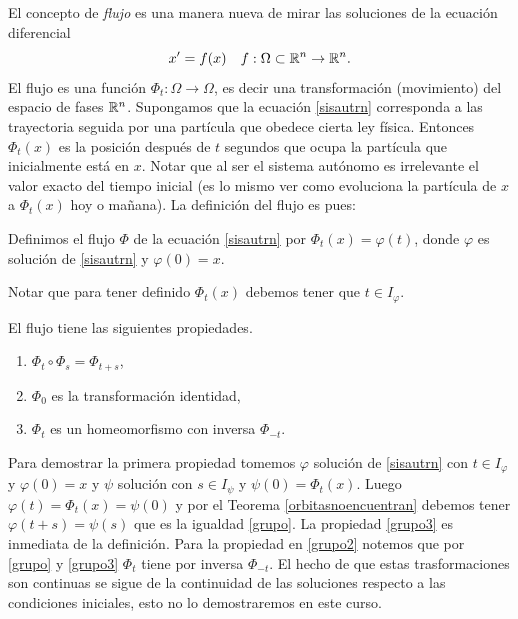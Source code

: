 El concepto de \emph{flujo} es una manera nueva de mirar las
soluciones de la ecuación diferencial
\begin{equation}\label{sisautrn}
    x'=f(x)\quad f:\Omega\subset\mathbb{R}^n\to\mathbb{R}^n.
\end{equation}
 El flujo es una función $\Phi_t:\Omega\to\Omega$, es decir una
 transformación (movimiento) del espacio de fases $\mathbb{R}^n$.
 Supongamos que la ecuación \eqref{sisautrn} corresponda a las trayectoria
 seguida por una partícula que obedece cierta ley física.
 Entonces  $\Phi_t(x)$ es la posición después de $t$ segundos que
 ocupa la partícula que inicialmente está en $x$. Notar que al ser
 el sistema autónomo es irrelevante el valor exacto del tiempo
 inicial (es lo mismo ver como evoluciona la partícula de $x$ a
 $\Phi_t(x)$ hoy o mañana). La definición del flujo es pues:
 \begin{definicion} Definimos el flujo $\Phi$ de la ecuación
 \eqref{sisautrn} por $\Phi_t(x)=\varphi(t)$, donde $\varphi$ es solución de
 \eqref{sisautrn} y $\varphi(0)=x$.
\end{definicion}
Notar que para tener definido $\Phi_t(x)$ debemos tener que $t\in
I_{\varphi}$.
\begin{teorema}{}
El flujo tiene las siguientes propiedades.
\begin{enumerate}
    \item\label{grupo} $\Phi_t\circ\Phi_s=\Phi_{t+s}$,
    \item\label{grupo3} $\Phi_0$ es la transformación identidad,
    \item\label{grupo2} $\Phi_t$ es un homeomorfismo con inversa $\Phi_{-t}$.
\end{enumerate}
\end{teorema}
\begin{demo}
Para demostrar la primera propiedad tomemos $\varphi$ solución de
\eqref{sisautrn} con $t\in I_{\varphi}$ y $\varphi(0)=x$ y $\psi$ solución
con $s\in I_{\psi}$ y $\psi(0)=\Phi_t(x)$. Luego
$\varphi(t)=\Phi_t(x)=\psi(0)$ y por el Teorema
\ref{orbitasnoencuentran} debemos tener $\varphi(t+s)=\psi(s)$ que es
la igualdad \ref{grupo}. La propiedad \ref{grupo3} es inmediata de
la definición. Para la propiedad en \ref{grupo2} notemos que por
\ref{grupo} y \ref{grupo3} $\Phi_t$ tiene por inversa $\Phi_{-t}$.
El hecho de que estas trasformaciones son continuas se sigue de la
continuidad de las soluciones respecto a las condiciones
iniciales, esto no lo demostraremos en este curso.
\end{demo}

